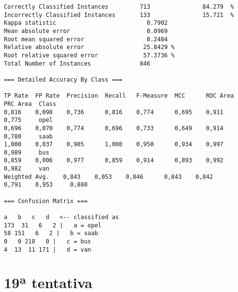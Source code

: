 \documentclass[
	article,			%
	11pt,				%
	oneside,			%
	a4paper,			%
	english,			%
	brazil,				%
	sumario=tradicional
	]{abntex2}
\begin{document}
\begin{lstlisting}
Correctly Classified Instances         713               84.279  %
Incorrectly Classified Instances       133               15.721  %
Kappa statistic                          0.7902
Mean absolute error                      0.0969
Root mean squared error                  0.2484
Relative absolute error                 25.8429 %
Root relative squared error             57.3736 %
Total Number of Instances              846     

=== Detailed Accuracy By Class ===

TP Rate  FP Rate  Precision  Recall   F-Measure  MCC      ROC Area  PRC Area  Class
0,816    0,098    0,736      0,816    0,774      0,695    0,911     0,775     opel
0,696    0,070    0,774      0,696    0,733      0,649    0,914     0,780     saab
1,000    0,037    0,905      1,000    0,950      0,934    0,997     0,989     bus
0,859    0,006    0,977      0,859    0,914      0,893    0,992     0,982     van
Weighted Avg.    0,843    0,053    0,846      0,843    0,842      0,791    0,953     0,880     

=== Confusion Matrix ===

a   b   c   d   <-- classified as
173  31   6   2 |   a = opel
58 151   6   2 |   b = saab
0   0 218   0 |   c = bus
4  13  11 171 |   d = van

\end{lstlisting}

\section{19ª tentativa}
\end{document}
